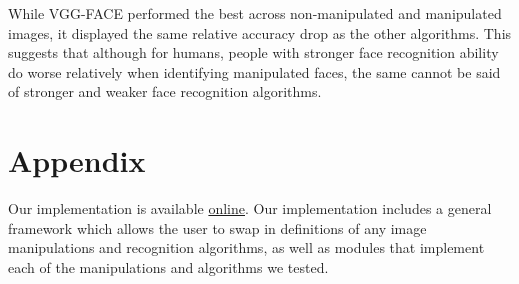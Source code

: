 \documentclass[pageno]{cos429}
\begin{document}
While VGG-FACE performed the best across non-manipulated and manipulated images, it displayed the same relative accuracy drop as the other algorithms. This suggests that although for humans, people with stronger face recognition ability do worse relatively when identifying manipulated faces, the same cannot be said of stronger and weaker face recognition algorithms.




\section{Appendix}\label{sec:Appendix}
Our implementation is available \href{https://github.com/cchen23/COS429_final_project}{online}. Our implementation includes a general framework which allows the user to swap in definitions of any image manipulations and recognition algorithms, as well as modules that implement each of the manipulations and algorithms we tested.
\end{document}
